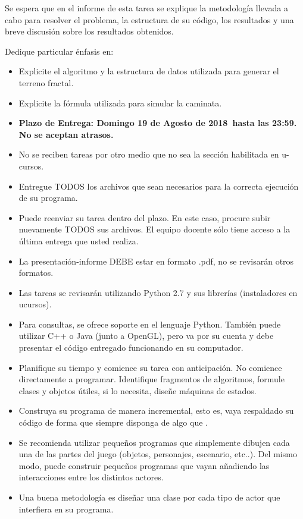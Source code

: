 \documentclass[letterpaper,11pt]{article} %
\def\plazoentrega {Domingo 19 de Agosto de 2018}
\begin{document}

Se espera que en el informe de esta tarea se explique la metodología llevada a cabo para resolver el problema, la estructura de su código, los resultados y una breve discusión sobre los resultados obtenidos. 

\newp Dedique particular énfasis en:

\begin{itemize}
	\item Explicite el algoritmo y la estructura de datos utilizada para generar el terreno fractal.
	\item Explicite la fórmula utilizada para simular la caminata.
\end{itemize}


\begin{itemize}
	\item \textbf{Plazo de Entrega: \plazoentrega \ hasta las 23:59. No se aceptan atrasos.}
	\item No se reciben tareas por otro medio que no sea la sección habilitada en u-cursos.
	\item Entregue TODOS los archivos que sean necesarios para la correcta ejecución de su programa.
	\item Puede reenviar su tarea dentro del plazo. En este caso, procure subir nuevamente TODOS sus archivos. El equipo docente sólo tiene acceso a la última entrega que usted realiza.
	\item La presentación-informe DEBE estar en formato .pdf, no se revisarán otros formatos.
	\item Las tareas se revisarán utilizando Python 2.7 y sus librerías (instaladores en ucursos).
	\item Para consultas, se ofrece soporte en el lenguaje Python. También puede utilizar C++ o Java (junto a OpenGL), pero va por su cuenta y debe presentar el código entregado funcionando en su computador.
\end{itemize}


\begin{itemize}
	\item Planifique su tiempo y comience su tarea con anticipación. No comience directamente a programar. Identifique fragmentos de algoritmos, formule clases y objetos útiles, si lo necesita, diseñe máquinas de estados.
	\item Construya su programa de manera incremental, esto es, vaya respaldado su código de forma que siempre disponga de algo que .
	\item Se recomienda utilizar pequeños programas que simplemente dibujen cada una de las partes del juego (objetos, personajes, escenario, etc..). Del mismo modo, puede construir pequeños programas que vayan añadiendo las interacciones entre los distintos actores.
	\item Una buena metodología es diseñar una clase por cada tipo de actor que interfiera en su programa.
\end{itemize}

\end{document}
